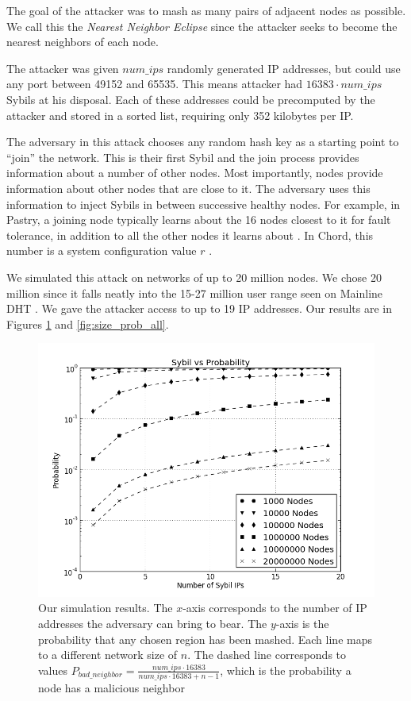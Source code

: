 The goal of the attacker was to mash as many pairs of adjacent nodes as possible.
We call this the \textit{Nearest Neighbor Eclipse} since the attacker seeks to become the nearest neighbors of each node.

The attacker was given $num\_ips$ randomly generated IP addresses, but could use any port between 49152 and 65535.
This means attacker had $ 16383 \cdot num\_ips $ Sybils at his disposal.
Each of these addresses could  be precomputed by the attacker and stored in a sorted list, requiring only 352 kilobytes per IP.

The adversary in this attack chooses any random hash key as a starting point to ``join'' the network.
This is their first Sybil and the join process provides information about a number of other nodes.
Most importantly, nodes provide information about other nodes that are close to it.
The adversary uses this information to inject Sybils in between successive healthy nodes.
For example, in Pastry, a joining node typically learns about the 16 nodes closest to it for fault tolerance, in addition to all the other nodes it learns about  \cite{pastry}.
In Chord, this number is a system configuration value $r$ \cite{chord}.

We simulated this attack on networks of up to 20 million nodes.
We chose 20 million since it falls neatly into the 15-27 million user range seen on Mainline DHT \cite{mainlineMeasure}.
We gave the attacker access to up to 19 IP addresses.
Our results are in Figures \ref{fig:exp2} and \ref{fig:size_prob_all}.

\begin{figure}
	\centering
	\includegraphics[width=0.5\linewidth]{figs/ip_prob_all}
	\caption[foo]{Our simulation results.  
		The $x$-axis corresponds to the number of IP addresses the adversary can bring to bear.
		The $y$-axis is the probability that any chosen region has been mashed.
		Each line maps to a different network size of $n$.
		The dashed line corresponds to values  $ P_{bad\_neighbor} =  \frac{num\_ips \cdot 16383}{num\_ips \cdot 16383 + n - 1}$, which is the probability a node has a malicious neighbor}
	\label{fig:exp2}
\end{figure}


